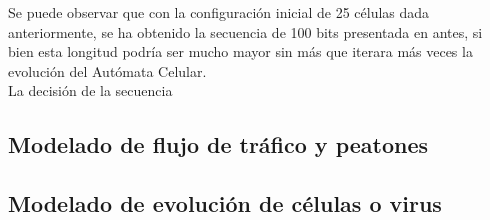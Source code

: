 Se puede observar que con la configuración inicial de 25 células dada anteriormente, se ha obtenido la secuencia de 100 bits presentada en antes, si bien esta longitud podría ser mucho mayor sin más que iterara más veces la evolución del Autómata Celular.\\

La decisión de la secuencia 
\subsection{Modelado de flujo de tráfico y peatones}

\subsection{Modelado de evolución de células o virus}







